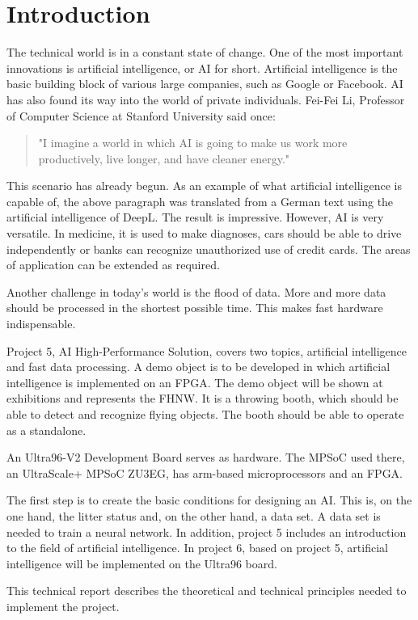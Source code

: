 \section{Introduction}
\label{sec:introduction}
The technical world is in a constant state of change. One of the most important innovations is artificial intelligence, or AI for short.
Artificial intelligence is the basic building block of various large companies, such as Google or Facebook.
AI has also found its way into the world of private individuals.
Fei-Fei Li, Professor of Computer Science at Stanford University said once:
\begin{quote}
	"I imagine a world in which AI is going to make us work more productively, live longer, and have cleaner energy."\cite{QuotesFuture}
\end{quote}
This scenario has already begun. As an example of what artificial intelligence is capable of, the above paragraph was translated from a German text using the artificial intelligence of DeepL. The result is impressive.
However, AI is very versatile. In medicine, it is used to make diagnoses, cars should be able to drive independently or banks can recognize unauthorized use of credit cards\cite{ArtificialIntelligenceAModernApproach}. 
The areas of application can be extended as required.

Another challenge in today's world is the flood of data. More and more data should be processed in the shortest possible time. This makes fast hardware indispensable.

Project 5, AI High-Performance Solution, covers two topics, artificial intelligence and fast data processing.
A demo object is to be developed in which artificial intelligence is implemented on an FPGA.
The demo object will be shown at exhibitions and represents the FHNW.
It is a throwing booth, which should be able to detect and recognize flying objects.
The booth should be able to operate as a standalone.

An Ultra96-V2 Development Board serves as hardware.
The MPSoC used there, an UltraScale+ MPSoC ZU3EG, has arm-based microprocessors and an FPGA.

The first step is to create the basic conditions for designing an AI.
This is, on the one hand, the litter status and, on the other hand, a data set. A data set is needed to train a neural network.
In addition, project 5 includes an introduction to the field of artificial intelligence.
In project 6, based on project 5, artificial intelligence will be implemented on the Ultra96 board.

This technical report describes the theoretical and technical principles needed to implement the project.